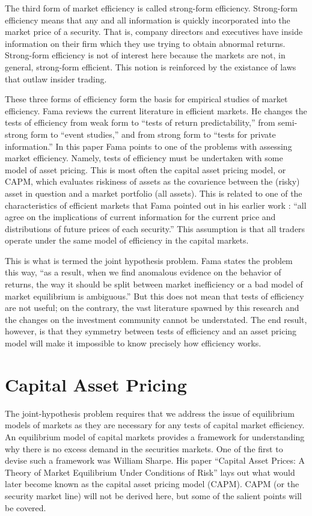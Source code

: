 The third form of market efficiency is called strong-form
efficiency.
Strong-form efficiency means that any and all information is
quickly
incorporated into the market price of a security.  That is, company
directors and executives have inside information on their firm
which
they use trying to obtain abnormal returns.  Strong-form efficiency
is
not of interest here because the markets are not, in general,
strong-form efficient.  This notion is reinforced by the
existance of laws that outlaw insider trading.

These three forms of efficiency form the basis for empirical
studies of market efficiency.  Fama \cite{fama91}
reviews the current literature
in efficient markets.  He changes the tests of efficiency from
weak form to ``tests of return predictability,'' from semi-strong
form
to
``event studies,'' and from strong form to ``tests for private
information.''
In this paper Fama points to one of the problems with assessing
market efficiency.  Namely, tests of efficiency
must be undertaken with some model of asset pricing.
This is most often the capital asset pricing model, or CAPM, which
evaluates riskiness of assets as the covarience between the
(risky) asset in
question and a market portfolio (all assets).
This is related to one of the characteristics 
of efficient markets that Fama pointed out in his earlier
work \cite{fama70}: ``all agree on the implications of current 
information for the current
price and distributions of future prices of each security.'' 
This assumption is that all traders operate under the same model of
efficiency in the capital markets.

This is what is termed the joint
hypothesis problem.  Fama states the problem
this way, ``as a result, when we find anomalous evidence on the
behavior of returns, the way it should be split between market
inefficiency or a bad model of market equilibrium is
ambiguous.'' \cite{fama91}  But
this does not mean that tests of efficiency are not useful; on the
contrary, the vast literature spawned by this research and the
changes
on the investment community cannot be understated.  The end result,
however, is that they symmetry between tests of efficiency and an
asset pricing model will make it impossible to know precisely how
efficiency works.

\section{Capital Asset Pricing}

The joint-hypothesis problem requires that we address the
issue of equilibrium models of markets as they are
necessary for any tests of capital market efficiency.  An
equilibrium model
of capital markets provides a framework for understanding
why there is no excess demand in the securities markets.
One of the first to devise such a framework 
was William Sharpe.  His paper ``Capital Asset Prices:  A
Theory of Market Equilibrium Under Conditions of Risk'' 
\cite{sharpe64} lays
out what would later become known as the capital asset
pricing model (CAPM).  CAPM (or the security market line)
will not be derived here, but some of the salient points
will be covered.

